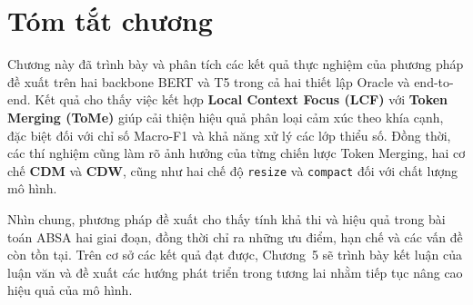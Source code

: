 \section*{Tóm tắt chương}

Chương này đã trình bày và phân tích các kết quả thực nghiệm của phương pháp đề xuất trên hai backbone BERT và T5 trong cả hai thiết lập Oracle và end-to-end. Kết quả cho thấy việc kết hợp \textbf{Local Context Focus (LCF)} với \textbf{Token Merging (ToMe)} giúp cải thiện hiệu quả phân loại cảm xúc theo khía cạnh, đặc biệt đối với chỉ số Macro-F1 và khả năng xử lý các lớp thiểu số. Đồng thời, các thí nghiệm cũng làm rõ ảnh hưởng của từng chiến lược Token Merging, hai cơ chế \textbf{CDM} và \textbf{CDW}, cũng như hai chế độ \texttt{resize} và \texttt{compact} đối với chất lượng mô hình.

Nhìn chung, phương pháp đề xuất cho thấy tính khả thi và hiệu quả trong bài toán ABSA hai giai đoạn, đồng thời chỉ ra những ưu điểm, hạn chế và các vấn đề còn tồn tại. Trên cơ sở các kết quả đạt được, Chương~5 sẽ trình bày kết luận của luận văn và đề xuất các hướng phát triển trong tương lai nhằm tiếp tục nâng cao hiệu quả của mô hình.

